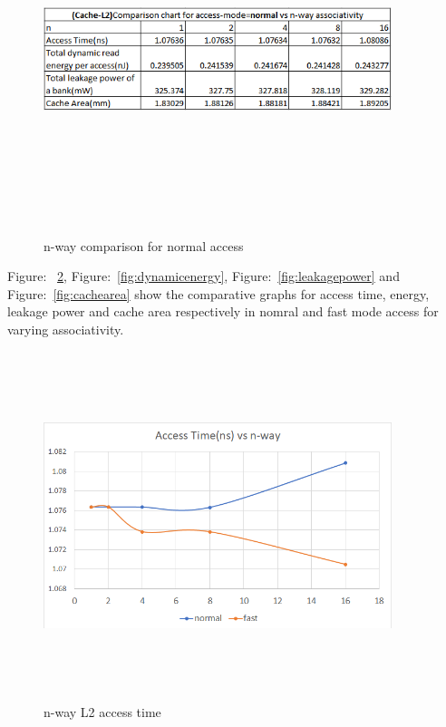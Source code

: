 \documentclass{tufte-handout}
\begin{document}
		
		\begin{figure}[h!]
		\label{fig:compL2TabNormal}
		\centering
		\includegraphics[width = 4in, height = 4in]{compL2TabNormal}
		\caption{n-way comparison for normal access }
		\end{figure}

		Figure: ~\ref{fig:accesstime}, Figure:~\ref{fig:dynamicenergy}, Figure:~\ref{fig:leakagepower} and Figure:~\ref{fig:cachearea} show the comparative graphs for access time, energy, leakage power and cache area respectively in nomral and fast mode access for varying associativity.

		
		\begin{figure}[h!]
		\label{fig:accesstime}
		\centering
		\includegraphics[width = 4in, height = 4in]{accesstime}
		\caption{n-way L2 access time }
		\end{figure}
\end{document}
